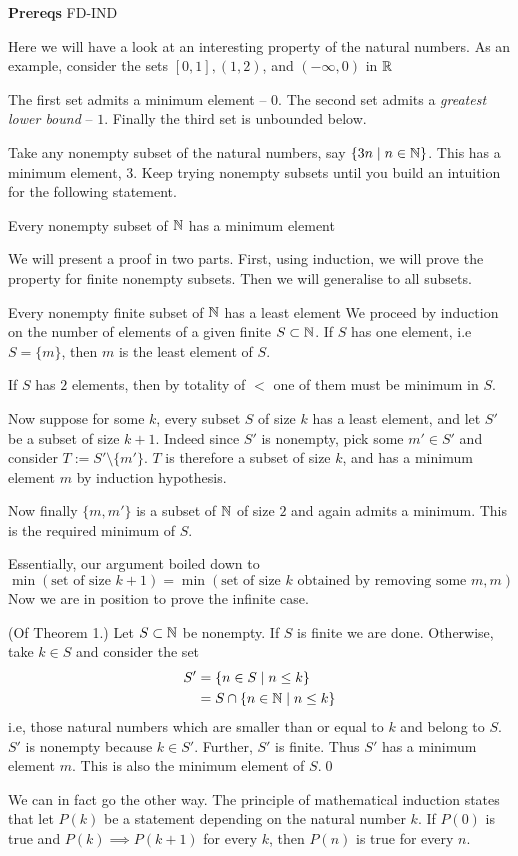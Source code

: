 

\textbf{Prereqs} FD-IND

Here we will have a look at an interesting property of the natural numbers. As an example, consider the sets $[0, 1], (1, 2)$, and $(-\infty, 0)$ in $\mathbb{R}$

The first set admits a minimum element -- $0$. The second set admits a \emph{greatest lower bound} -- $1$. Finally the third set is unbounded below.

Take any nonempty subset of the natural numbers, say $\{3n \space \mid \space n \in \mathbb{N}\}$. This has a minimum element, $3$. Keep trying nonempty subsets until you build an intuition for the following statement.

\begin{SNP}{\thm}{Every nonempty subset of $\mathbb{N}$ has a minimum element}
\end{SNP}

We will present a proof in two parts. First, using induction, we will prove the property for finite nonempty subsets. Then we will generalise to all subsets.

\begin{SWP}{\lm}{Every nonempty finite subset of $\mathbb{N}$ has a least element}
We proceed by induction on the number of elements of a given finite $S \subset \mathbb{N}$. If $S$ has one element, i.e $S = \{m\}$, then $m$ is the least element of $S$.

If $S$ has $2$ elements, then by totality of $<$ one of them must be minimum in $S$.

Now suppose for some $k$, every subset $S$ of size $k$ has a least element, and let $S'$ be a subset of size $k + 1$. Indeed since $S'$ is nonempty, pick some $m' \in S'$ and consider $T := S' \setminus \{m'\}$. $T$ is therefore a subset of size $k$, and has a minimum element $m$ by induction hypothesis.

Now finally $\{m, m'\}$ is a subset of $\mathbb{N}$ of size $2$ and again admits a minimum. This is the required minimum of $S$.
\end{SWP}
Essentially, our argument boiled down to
$$
\min (\text{set of size } k + 1) = \min(\text{set of size } k \text{ obtained by removing some }m, m)
$$
Now we are in position to prove the infinite case.
\begin{smrg}
\pf (Of Theorem 1.) Let $S \subset \mathbb{N}$ be nonempty. If $S$ is finite we are done. Otherwise, take $k \in S$ and consider the set
\begin{align*}
S' &= \{n \in S \space \mid \space n \leq k\} \\
&= S \cap \{n \in \mathbb{N} \space \mid \space n \leq k\}
\end{align*}
i.e, those natural numbers which are smaller than or equal to $k$ and belong to $S$. $S'$ is nonempty because $k \in S'$. Further, $S'$ is finite. Thus $S'$ has a minimum element $m$. This is also the minimum element of $S$.\qed
\end{smrg}
\newpage
We can in fact go the other way. The principle of mathematical induction states that let $P(k)$ be a statement depending on the natural number $k$. If $P(0)$ is true and $P(k) \implies P(k + 1)$ for every $k$, then $P(n)$ is true for every $n$.

